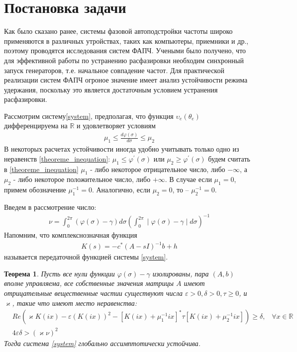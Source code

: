 \documentclass[a4paper,14pt]{extarticle} %
\newtheorem{theorem}{Теорема}
\begin{document}
\newpage
\section{Постановка задачи}
Как было сказано ранее, системы фазовой автоподстройки частоты широко применяются в различных утройствах, таких как компьютеры, приемники и др., поэтому проводятся исследования систем ФАПЧ. Учеными было получено, что для эффективной работы по устранению расфазировки необходим синхронный запуск генераторов, т.е. начальное совпадение частот. Для практической реализации систем ФАПЧ огроное значение имеет анализ устойчивости режима удержания, поскольку это является достаточным условием устранения расфазировки.

Рассмотрим систему\eqref{system}, предполагая, что функция $\upsilon_e(\theta_e)$ дифференцируема на $\mathbb {R}$ и удовлетворяет условиям
 \begin{equation}\label{theoreme_inequation}
 \begin{aligned}
\mu_1 \leq \frac{d\varphi(\sigma)}{d\sigma} \leq \mu_2
 \end{aligned}
\end{equation}
В некоторых расчетах устойчивости иногда удобно учитывать только одно из неравенств \eqref{theoreme_inequation}: $\mu_1 \leq \varphi^\prime(\sigma)$ или $\mu_2 \geq \varphi^\prime(\sigma)$ будем считать в \eqref{theoreme_inequation} $\mu_1$ - либо некоторое отрицательное число, либо $-\infty$, а $\mu_2$ - либо некоторое положительное число, либо $+\infty$. В случае если $\mu_1 = 0$, примем обозначение $\mu_1^{-1} = 0$. Аналогично, если $\mu_2 = 0$, то -- $\mu_2^{-1} = 0$.

Введем в рассмотрение число:
 \begin{equation}
 \begin{aligned}
\nu = \int_{0}^{2\pi} (\varphi(\sigma) - \gamma) d\sigma (\int_{0}^{2\pi} \mid \varphi(\sigma) - \gamma \mid d\sigma)^{-1}
 \end{aligned}
\end{equation}
Напомним, что комплекснозначная функция
 \begin{equation}
 \begin{aligned}
K(s) = -c^*(A - sI)^{-1}b + h
\end{aligned}
\end{equation}
называется передаточной функцией системы \eqref{system}.

\begin{theorem}\label{th1}
Пусть все нули функции $\varphi(\sigma) - \gamma$ изолированы, пара $(A, b)$ вполне управляема, все собственные значения матрицы $A$ имеют отрицательные вещественные частии существуют числа $\varepsilon > 0, \delta > 0, \tau \geq 0$, и $\varkappa$, такие что имеют место неравенства:
 \begin{align}
&Re(\varkappa K(ix)- \varepsilon(K(ix))^2-[K(ix)+\mu_1^{-1}ix]^*\tau[K(ix)+\mu_2^{-1}ix])\geq\delta\text{,}\quad \forall x \in \mathbb{R}\label{first_th_eq}\\
&4\varepsilon\delta > (\varkappa\nu)^2
\end{align}
Тогда система \eqref{system} глобально ассимптотически устойчива.
\end{theorem}
\end{document}
